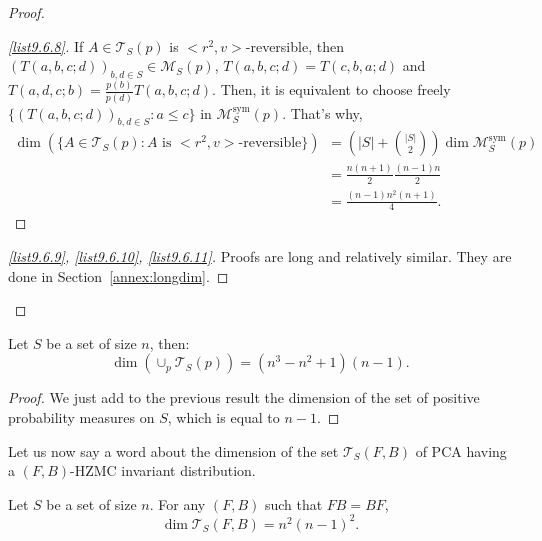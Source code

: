 \documentclass[10pt]{amsart}
\theoremstyle{definition}\newtheorem{defi}[theo]{Definition}\newtheorem{rema}[theo]{Remark}\newtheorem{exam}[theo]{Example}\newtheorem{exem}[theo]{Example}\newtheorem{nota}[theo]{Notation}
\newcounter{a}
\newcommand{\triang}[2]{\mathcal{T}_{#1} \left(#2 \right)}
\DeclareMathOperator{\sym}{sym}
\begin{document}
\begin{proof}
\begin{proof}[{\eqref{list9.6.8}}]If $A \in \triang{S}{p}$ is $<r^2,v>$-reversible, then $(T(a,b,c;d))_{b,d \in S} \in \mathcal{M}_S(p)$, $T(a,b,c;d) = T(c,b,a;d)$ and $T(a,d,c;b) = \frac{p(b)}{p(d)} T(a,b,c;d)$. Then, it is equivalent to choose freely $\{ (T(a,b,c;d))_{b,d \in S} : a \leq c \}$ in $\mathcal{M}^{\sym}_S(p)$. That's why,
\begin{align*}
\dim \left(\{A \in \triang{S}{p} : \text{$A$ is $<r^2,v>$-reversible}\} \right) & = \left(|S| + \binom{|S|}{2} \right) \dim \mathcal{M}^{\sym}_S(p) \\
& = \frac{n(n+1)}{2} \frac{(n-1) n}{2} \\
& = \frac{(n-1)n^2(n+1)}{4}.
\end{align*}
\let\qed\relax
\end{proof}

\begin{proof}[{\eqref{list9.6.9}}, {\eqref{list9.6.10}}, {\eqref{list9.6.11}}]
Proofs are long and relatively similar. They are done in Section~\ref{annex:longdim}.
\end{proof}
\let\qed\relax
\end{proof}

\begin{coro}\label{cor:dimp}
Let $S$ be a set of size $n$, then:
\[
\dim \left(\cup_p \triang{S}{p} \right) = (n^3-n^2+1)(n-1).
\]
\end{coro}

\begin{proof}
We just add to the previous result the dimension of the set of positive probability measures on $S$, which is equal to $n-1$.
\end{proof}

Let us now say a word about the dimension of the set $\triang{S}{F,B}$ of PCA having a $(F,B)$-HZMC invariant distribution.

\begin{prop}
Let $S$ be a set of size $n$. For any $(F,B)$ such that $FB=BF$,
\begin{equation*}
\dim \triang{S}{F,B} = n^2 (n-1)^2.
\end{equation*}
\end{prop}

\end{document}
